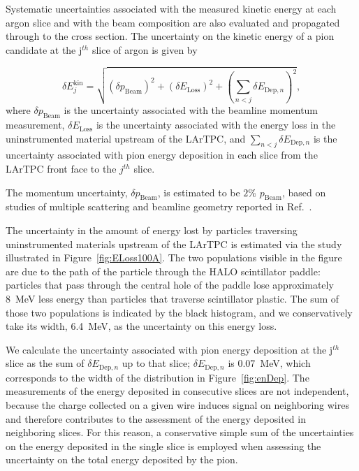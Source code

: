 \documentclass[%
 floatfix,
 reprint,
 twocolumn,
superscriptaddress,
showpacs,preprintnumbers,
 amsmath,amssymb,
 aps,
prd,
]{revtex4-1}
\begin{document}
Systematic uncertainties associated with the measured kinetic energy at each argon slice and with the beam composition are also evaluated and propagated through to the cross section.
The uncertainty on the kinetic energy of a pion candidate at the j$^{th}$ slice of argon  is given by


\begin{equation}
\delta E^\text{kin}_{j} = \sqrt{(\delta p_{\text{Beam}})^2 + (\delta E_{\text{Loss}})^2 +  ( \sum_{n < j} \delta E_{\text{Dep},n})^2}, 
\end{equation}
where $\delta p_{\text{Beam}}$ is the uncertainty associated with the beamline momentum measurement, $\delta E_{\text{Loss}}$ is the uncertainty associated with the energy loss in the uninstrumented material upstream of the LArTPC, and $\sum_{n < j}\delta E_{\text{Dep},n}$  is the uncertainty associated with pion energy deposition in each slice from the LArTPC front face to the $j^{th}$ slice. 

The momentum uncertainty,  $\delta p_{\text{Beam}}$, is estimated to be $2\%$ $p_{\text{Beam}}$, based on studies of multiple scattering and beamline geometry reported in Ref.~\cite{Acciarri_2020}.

The uncertainty in the amount of energy lost by particles traversing uninstrumented materials upstream of the LArTPC is estimated via the study illustrated in Figure~\ref{fig:ELoss100A}. The two populations visible in the figure are due to the path of the particle through the HALO scintillator paddle: particles that pass through the central hole of the paddle lose approximately 8~MeV less energy than particles that traverse scintillator plastic. The sum of those two populations is indicated by the black histogram, and we conservatively take its width, 6.4~MeV, as the uncertainty on this energy loss. 

We calculate the uncertainty associated with pion energy deposition at the j$^{th}$ slice as the sum of $\delta E_{\text{Dep},n}$ up to that slice; $\delta E_{\text{Dep},n}$ is 0.07~MeV,  which corresponds to the width of the distribution in  Figure~\ref{fig:enDep}. The measurements of the energy deposited in consecutive slices are not independent, because the charge collected on a given wire induces signal on neighboring wires and therefore contributes to the assessment of the energy deposited in neighboring slices. For this reason, a conservative simple sum of the uncertainties on the energy deposited in the single slice is employed when assessing the uncertainty on the total energy deposited by the pion.
\end{document}
